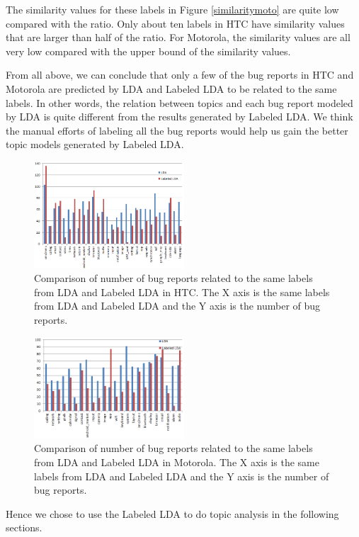 \documentclass[10pt, conference, compsocconf]{IEEEtran}
\begin{document}
The similarity values for these labels in Figure \ref{similaritymoto} are quite low compared with the ratio. Only about ten labels in HTC have similarity values that are larger than half of the ratio. For Motorola, the similarity values are all very low compared with the upper bound of the similarity values.

From all above, we can conclude that only a few of the bug reports in HTC and Motorola are predicted by LDA and Labeled LDA to be related to the same labels. In other words, the relation between topics and each bug report modeled by LDA is quite different from the results generated by Labeled LDA. We think the manual efforts of labeling all the bug reports would help us gain the better topic models generated by Labeled LDA. 
\begin{figure}[htb]
\centering
\includegraphics[width=0.5\textwidth]{htcldallda.png}
\caption{Comparison of number of bug reports related to the same labels from LDA and Labeled LDA in HTC. The X axis is the same labels from LDA and Labeled LDA and the Y axis is the number of bug reports.}
\label{bughtc}
\end{figure}
\begin{figure}[!htb]
\centering
\includegraphics[width=0.5\textwidth]{motoldallda.png}
\caption{Comparison of number of bug reports related to the same labels from LDA and Labeled LDA in Motorola. The X axis is the same labels from LDA and Labeled LDA and the Y axis is the number of bug reports.}
\label{bugmoto}
\end{figure}
Hence we chose to use the Labeled LDA to do topic analysis in the following sections.
\end{document}

